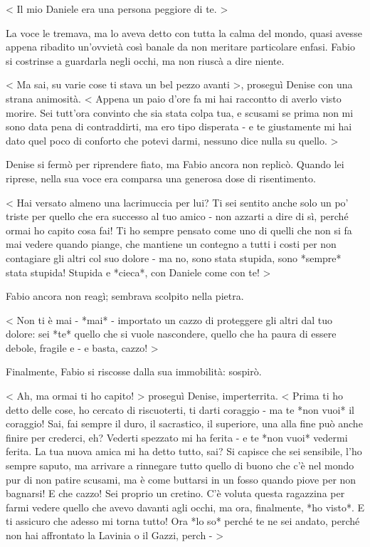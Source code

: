 < Il mio Daniele era una persona peggiore di te. >

La voce le tremava, ma lo aveva detto con tutta la calma del mondo, quasi avesse appena ribadito un'ovvietà così banale da non meritare particolare enfasi. Fabio si costrinse a guardarla negli occhi, ma non riuscà a dire niente.

< Ma sai, su varie cose ti stava un bel pezzo avanti >, proseguì Denise con una strana animosità. < Appena un paio d'ore fa mi hai raccontto di averlo visto morire. Sei tutt'ora convinto che sia stata colpa tua, e scusami se prima non mi sono data pena di contraddirti, ma ero tipo disperata - e te giustamente mi hai dato quel poco di conforto che potevi darmi, nessuno dice nulla su quello.  >

Denise si fermò per riprendere fiato, ma Fabio ancora non replicò. Quando lei riprese, nella sua voce era comparsa una generosa dose di risentimento.

< Hai versato almeno una lacrimuccia per lui? Ti sei sentito anche solo un po' triste per quello che era successo al tuo amico - non azzarti a dire di sì, perché ormai ho capito cosa fai! Ti ho sempre pensato come uno di quelli che non si fa mai vedere quando piange, che mantiene un contegno a tutti i costi per non contagiare gli altri col suo dolore - ma no, sono stata stupida, sono *sempre* stata stupida! Stupida e *cieca*, con Daniele come con te! >

Fabio ancora non reagì; sembrava scolpito nella pietra.

< Non ti è mai - *mai* - importato un cazzo di proteggere gli altri dal tuo dolore: sei *te* quello che si vuole nascondere, quello che ha paura di essere debole, fragile e - e basta, cazzo! >

Finalmente, Fabio si riscosse dalla sua immobilità: sospirò.

< Ah, ma ormai ti ho capito! > proseguì Denise, imperterrita. < Prima ti ho detto delle cose, ho cercato di riscuoterti, ti darti coraggio - ma te *non vuoi* il coraggio! Sai, fai sempre il duro, il sacrastico, il superiore, una alla fine può anche finire per crederci, eh? Vederti spezzato mi ha ferita - e te *non vuoi* vedermi ferita. La tua nuova amica mi ha detto tutto, sai? Si capisce che sei sensibile, l'ho sempre saputo, ma arrivare a rinnegare tutto quello di buono che c'è nel mondo pur di non patire scusami, ma è come buttarsi in un fosso quando piove per non bagnarsi! E che cazzo! Sei proprio un cretino. C'è voluta questa ragazzina per farmi vedere quello che avevo davanti agli occhi, ma ora, finalmente, *ho visto*. E ti assicuro che adesso mi torna tutto! Ora *lo so* perché te ne sei andato, perché non hai affrontato la Lavinia o il Gazzi, perch - >

